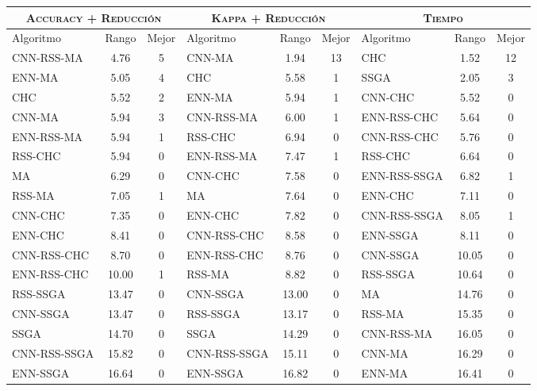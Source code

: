 \begin{table}[]
\centering
\begin{adjustbox}{max width =\textwidth}
\begin{tabular}{l c c|l c c|l c c}
\hline
\multicolumn{3}{c|}{\textsc{Accuracy + Reducción}}
	& \multicolumn{3}{c|}{\textsc{Kappa + Reducción}}
	& \multicolumn{3}{c}{\textsc{Tiempo}} \\
\hline
Algoritmo & Rango & Mejor & Algoritmo & Rango & Mejor & Algoritmo & Rango & Mejor \\
\hline
\hline

CNN-RSS-MA   & 4.76  & 5 & CNN-MA       & 1.94  & 13 & CHC          & 1.52  & 12 \\
ENN-MA       & 5.05  & 4 & CHC          & 5.58  & 1  & SSGA         & 2.05  & 3 \\
CHC          & 5.52  & 2 & ENN-MA       & 5.94  & 1  & CNN-CHC      & 5.52  & 0 \\
CNN-MA       & 5.94  & 3 & CNN-RSS-MA   & 6.00  & 1  & ENN-RSS-CHC  & 5.64  & 0 \\
ENN-RSS-MA   & 5.94  & 1 & RSS-CHC      & 6.94  & 0  & CNN-RSS-CHC  & 5.76  & 0 \\
RSS-CHC      & 5.94  & 0 & ENN-RSS-MA   & 7.47  & 1  & RSS-CHC      & 6.64  & 0 \\
MA           & 6.29  & 0 & CNN-CHC      & 7.58  & 0  & ENN-RSS-SSGA & 6.82  & 1 \\
RSS-MA       & 7.05  & 1 & MA           & 7.64  & 0  & ENN-CHC      & 7.11  & 0 \\
CNN-CHC      & 7.35  & 0 & ENN-CHC      & 7.82  & 0  & CNN-RSS-SSGA & 8.05  & 1 \\
ENN-CHC      & 8.41  & 0 & CNN-RSS-CHC  & 8.58  & 0  & ENN-SSGA     & 8.11  & 0 \\
CNN-RSS-CHC  & 8.70  & 0 & ENN-RSS-CHC  & 8.76  & 0  & CNN-SSGA     & 10.05 & 0 \\
ENN-RSS-CHC  & 10.00 & 1 & RSS-MA       & 8.82  & 0  & RSS-SSGA     & 10.64 & 0 \\
RSS-SSGA     & 13.47 & 0 & CNN-SSGA     & 13.00 & 0  & MA           & 14.76 & 0 \\
CNN-SSGA     & 13.47 & 0 & RSS-SSGA     & 13.17 & 0  & RSS-MA       & 15.35 & 0 \\
SSGA         & 14.70 & 0 & SSGA         & 14.29 & 0  & CNN-RSS-MA   & 16.05 & 0 \\
CNN-RSS-SSGA & 15.82 & 0 & CNN-RSS-SSGA & 15.11 & 0  & CNN-MA       & 16.29 & 0 \\
ENN-SSGA     & 16.64 & 0 & ENN-SSGA     & 16.82 & 0  & ENN-MA       & 16.41 & 0 \\

\end{tabular}
\end{adjustbox}
\end{table}
